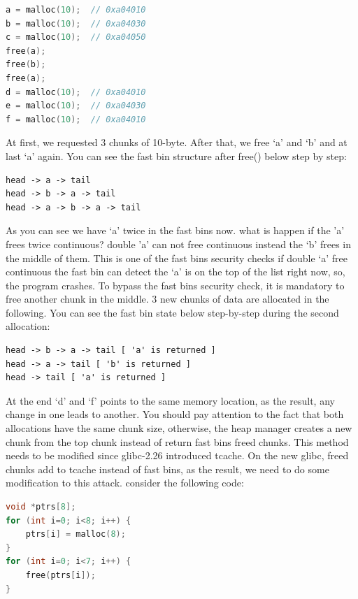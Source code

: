 \documentclass{masterthesis}
\newcommand*\libc{glibc}
\newcommand*\tch{tcache}
\newcommand*\fb{fast bins}
\begin{document}
\begin{lstlisting}[language=c,frame=tlrb]
a = malloc(10);  // 0xa04010
b = malloc(10);  // 0xa04030
c = malloc(10);  // 0xa04050
free(a);
free(b); 
free(a);
d = malloc(10);  // 0xa04010
e = malloc(10);  // 0xa04030
f = malloc(10);  // 0xa04010
\end{lstlisting}

At first, we requested 3 chunks of 10-byte. After that, we free ‘a’ and ‘b’ and at last ‘a' again. You can see the fast bin structure after free() below step by step:

\begin{lstlisting}[frame=tlrb]
head -> a -> tail
head -> b -> a -> tail
head -> a -> b -> a -> tail
\end{lstlisting}

As you can see we have ‘a’ twice in the \fb{} now. what is happen if the 'a' frees twice continuous? double 'a' can not free continuous instead the ‘b’ frees in the middle of them. This is one of the \fb{} security checks if double ‘a’ free continuous the fast bin can detect the ‘a’ is on the top of the list right now, so, the program crashes. To bypass the \fb{} security check, it is mandatory to free another chunk in the middle. 3 new chunks of data are allocated in the following. You can see the fast bin state below step-by-step during the second allocation:

\begin{lstlisting}[frame=tlrb]
head -> b -> a -> tail [ 'a' is returned ]
head -> a -> tail [ 'b' is returned ]
head -> tail [ 'a' is returned ]
\end{lstlisting}

At the end ‘d’ and ‘f’ points to the same memory location, as the result, any change in one leads to another. You should pay attention to the fact that both allocations have the same chunk size, otherwise, the heap manager creates a new chunk from the top chunk instead of return \fb{} freed chunks.
This method needs to be modified since \libc{-2.26} introduced \tch{}. On the new \libc{}, freed chunks add to \tch{} instead of \fb{}, as the result, we need to do some modification to this attack. consider the following code:

\begin{lstlisting}[language=c,frame=tlrb]
void *ptrs[8];
for (int i=0; i<8; i++) {
	ptrs[i] = malloc(8);
}
for (int i=0; i<7; i++) {
	free(ptrs[i]);
}
\end{lstlisting}
\end{document}
